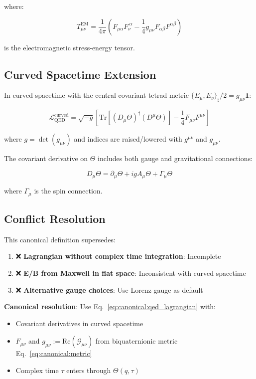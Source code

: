 where:

\begin{equation}
T_{\mu\nu}^{\text{EM}} = \frac{1}{4\pi}\left(F_{\mu\alpha}F_\nu^{\ \alpha} - \frac{1}{4}g_{\mu\nu}F_{\alpha\beta}F^{\alpha\beta}\right)
\end{equation}

is the electromagnetic stress-energy tensor.

\subsection{Curved Spacetime Extension}

In curved spacetime with the central covariant-tetrad metric $\{E_\mu,E_\nu\}_\sharp/2=g_{\mu\nu}\mathbf1$:

\begin{equation}
\label{eq:canonical:qed_curved}
\mathcal{L}_{\text{QED}}^{\text{curved}} = \sqrt{-g}\left[\text{Tr}\left[(D_\mu\Theta)^\dagger (D^\mu\Theta)\right] - \frac{1}{4} F_{\mu\nu} F^{\mu\nu}\right]
\end{equation}

where $g = \det(g_{\mu\nu})$ and indices are raised/lowered with $g^{\mu\nu}$ and $g_{\mu\nu}$.

The covariant derivative on $\Theta$ includes both gauge and gravitational connections:

\begin{equation}
D_\mu\Theta = \partial_\mu\Theta + ig A_\mu\Theta + \Gamma_\mu\Theta
\end{equation}

where $\Gamma_\mu$ is the spin connection.

\subsection{Conflict Resolution}

This canonical definition supersedes:

\begin{enumerate}
    \item ❌ \textbf{Lagrangian without complex time integration}: Incomplete
    \item ❌ \textbf{E/B from Maxwell in flat space}: Inconsistent with curved spacetime
    \item ❌ \textbf{Alternative gauge choices}: Use Lorenz gauge as default
\end{enumerate}

\textbf{Canonical resolution}: Use Eq.~\ref{eq:canonical:qed_lagrangian} with:
\begin{itemize}
    \item Covariant derivatives in curved spacetime
    \item $F_{\mu\nu}$ and $g_{\mu\nu} := \text{Re}(\mathcal{G}_{\mu\nu})$ from biquaternionic metric Eq.~\ref{eq:canonical:metric}
    \item Complex time $\tau$ enters through $\Theta(q,\tau)$
\end{itemize}

